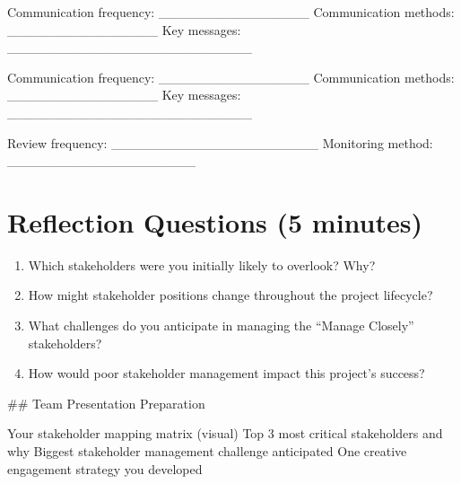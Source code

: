 \documentclass[letterpaper,10pt,english]{sphinxmanual}
\begin{document}
\sphinxAtStartPar
{}
\sphinxhyphen{} Communication frequency: \_\_\_\_\_\_\_\_\_\_\_\_\_\_\_\_
\sphinxhyphen{} Communication methods: \_\_\_\_\_\_\_\_\_\_\_\_\_\_\_\_
\sphinxhyphen{} Key messages: \_\_\_\_\_\_\_\_\_\_\_\_\_\_\_\_\_\_\_\_\_\_\_\_\_\_

\sphinxAtStartPar
{}
\sphinxhyphen{} Communication frequency: \_\_\_\_\_\_\_\_\_\_\_\_\_\_\_\_
\sphinxhyphen{} Communication methods: \_\_\_\_\_\_\_\_\_\_\_\_\_\_\_\_
\sphinxhyphen{} Key messages: \_\_\_\_\_\_\_\_\_\_\_\_\_\_\_\_\_\_\_\_\_\_\_\_\_\_

\sphinxAtStartPar
{}
\sphinxhyphen{} Review frequency: \_\_\_\_\_\_\_\_\_\_\_\_\_\_\_\_\_\_\_\_\_\_
\sphinxhyphen{} Monitoring method: \_\_\_\_\_\_\_\_\_\_\_\_\_\_\_\_\_\_\_\_


\section{Reflection Questions (5 minutes)}
\label{\detokenize{mapping_stakeholder:reflection-questions-5-minutes}}\begin{enumerate}
%
\item {} 
\sphinxAtStartPar
Which stakeholders were you initially likely to overlook? Why?

\item {} 
\sphinxAtStartPar
How might stakeholder positions change throughout the project lifecycle?

\item {} 
\sphinxAtStartPar
What challenges do you anticipate in managing the “Manage Closely” stakeholders?

\item {} 
\sphinxAtStartPar
How would poor stakeholder management impact this project’s success?

\end{enumerate}

\sphinxAtStartPar
\#\# Team Presentation Preparation

\sphinxAtStartPar
{}
\sphinxhyphen{} Your stakeholder mapping matrix (visual)
\sphinxhyphen{} Top 3 most critical stakeholders and why
\sphinxhyphen{} Biggest stakeholder management challenge anticipated
\sphinxhyphen{} One creative engagement strategy you developed
\end{document}
